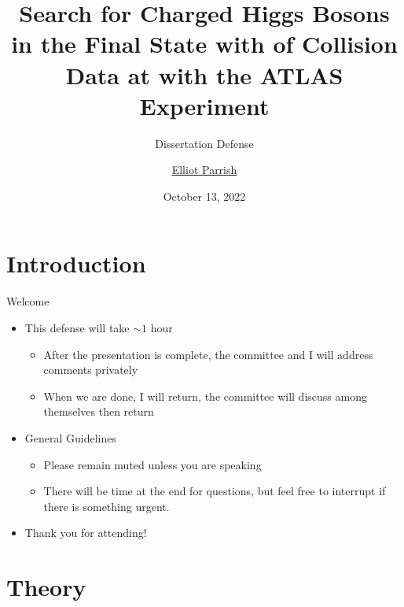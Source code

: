 \documentclass[aspectratio=169,xcolor=table]{beamer}
\title[Search for \HpmLong with ATLAS]
{Search for Charged Higgs Bosons in the \taulep Final State with \LUMI of \pp Collision Data at \sqs with the ATLAS Experiment}
\subtitle{Dissertation Defense}
\author[Elliot Parrish]
{\texorpdfstring{\underline{Elliot Parrish}}{Elliot Parrish}}
\institute[NIU] {\inst{\dag}Northern Illinois University, USA}
\date{October 13, 2022}
\begin{document}
\frame{\titlepage}




\begin{frame}{\contentsname}
  \begin{multicols}{2}
    \tableofcontents
  \end{multicols}
\end{frame}

\section{Introduction}
  
  \begin{frame}[t]{Welcome}
    \begin{itemize}
      \item This defense will take $\sim 1$ hour
      \begin{itemize}
        \item After the presentation is complete, the committee and I will address comments privately
        \item When we are done, I will return, the committee will discuss among themselves then return
      \end{itemize}
      \item General Guidelines
      \begin{itemize}
        \item Please remain muted unless you are speaking
        \item There will be time at the end for questions, but feel free to interrupt if there is something urgent.
      \end{itemize}
      \item Thank you for attending!
    \end{itemize}
  \end{frame}

\section{Theory}
\end{document}
